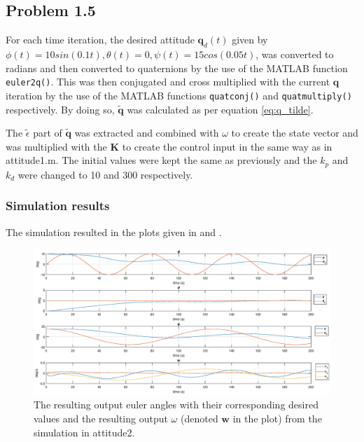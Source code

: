 

\subsection*{Problem 1.5}
For each time iteration, the desired attitude $\mathbf{q}_d(t)$ given by $\phi(t) = 10sin(0.1t), \theta(t) = 0, \psi(t) = 15cos(0.05t)$, was converted to radians and then converted to quaternions by the use of the MATLAB function \texttt{euler2q()}. This was then conjugated and cross multiplied with the current $\mathbf{q}$ iteration by the use of the MATLAB functions \texttt{quatconj()} and \texttt{quatmultiply()} respectively. By doing so, $\mathbf{\tilde{q}}$ was calculated as per equation \eqref{eq:q_tilde}.

The $\tilde{\epsilon}$ part of $\mathbf{\tilde{q}}$ was extracted and combined with $\omega$ to create the state vector and was multiplied with the $\mathbf{K}$ to create the control input in the same way as in {\color{blue} attitude1.m}. The initial values were kept the same as previously and the $k_p$ and $k_d$ were changed to 10 and 300 respectively. 

\subsubsection*{Simulation results}

The simulation resulted in the plots given in  and .

\begin{figure}
	\centering
	\includegraphics[width=1.00\textwidth]{figures/2_euler.eps}
	\caption{The resulting output euler angles with their corresponding desired values and the resulting output $\omega$ (denoted $\mathbf{w}$ in the plot) from the simulation in attitude2.}
\label{fig:sim_attitude2_euler}
\end{figure}

